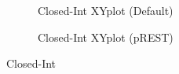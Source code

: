 \documentclass[T4paper.tex]{subfiles}
\begin{document}
\begin{figure}
\centering
\begin{subfigure}{.5\textwidth}
  \centering
   \caption{Closed-Int XYplot (Default)}
   \label{fig:C2I_xyplot}
\end{subfigure}%
\begin{subfigure}{.5\textwidth}
   \centering
   \caption{Closed-Int XYplot (pREST)}
   \label{fig:C2I_xyplot_pREST}
\end{subfigure}
\caption{Closed-Int}
\label{fig:C2I_xy}
\end{figure}
\end{document}
